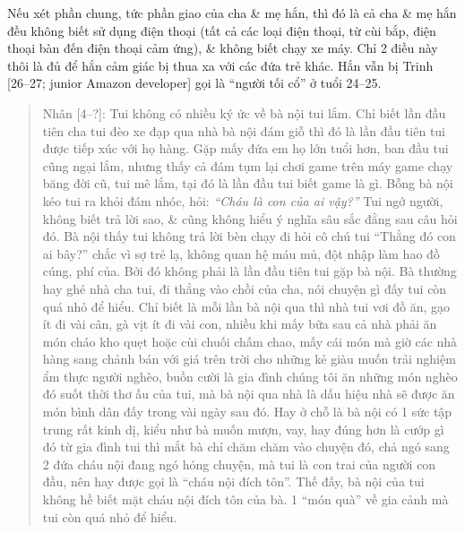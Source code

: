 \documentclass[12pt,oneside]{book}
\begin{document}
Nếu xét phần chung, tức phần giao của cha \& mẹ hắn, thì đó là cả cha \& mẹ hắn đều không biết sử dụng điện thoại (tất cả các loại điện thoại, từ cùi bắp, điện thoại bàn đến điện thoại cảm ứng), \& không biết chạy xe máy. Chỉ 2 điều này thôi là đủ để hắn cảm giác bị thua xa với các đứa trẻ khác. Hắn vẫn bị {\sf Trinh [26--27; junior Amazon developer]} gọi là ``người tối cổ'' ở tuổi 24--25.
\begin{quote}
	{\sf Nhân [4--?]}: Tui không có nhiều ký ức về bà nội tui lắm. Chỉ biết lần đầu tiên cha tui đèo xe đạp qua nhà bà nội đám giỗ thì đó là lần đầu tiên tui được tiếp xúc với họ hàng. Gặp mấy đứa em họ lớn tuổi hơn, ban đầu tui cũng ngại lắm, nhưng thấy cả đám tụm lại chơi game trên máy game chạy băng đời cũ, tui mê lắm, tại đó là lần đầu tui biết game là gì. Bỗng bà nội kéo tui ra khỏi đám nhóc, hỏi: {\it``Cháu là con của ai vậy?''} Tui ngớ người, không biết trả lời sao, \& cũng không hiểu ý nghĩa sâu sắc đằng sau câu hỏi đó. Bà nội thấy tui không trả lời bèn chạy đi hỏi cô chú tui ``Thằng đó con ai bây?'' chắc vì sợ trẻ lạ, không quan hệ máu mủ, đột nhập làm hao đồ cúng, phí của. Bởi đó không phải là lần đầu tiên tui gặp bà nội. Bà thường hay ghé nhà cha tui, đi thẳng vào chồi của cha, nói chuyện gì đấy tui còn quá nhỏ để hiểu. Chỉ biết là mỗi lần bà nội qua thì nhà tui vơi đồ ăn, gạo ít đi vài cân, gà vịt ít đi vài con, nhiều khi mấy bữa sau cả nhà phải ăn món cháo kho quẹt hoặc cùi chuối chấm chao, mấy cái món mà giờ các nhà hàng sang chảnh bán với giá trên trời cho những kẻ giàu muốn trải nghiệm ẩm thực người nghèo, buồn cười là gia đình chúng tôi ăn những món nghèo đó suốt thời thơ ấu của tui, mà bà nội qua nhà là dấu hiệu nhà sẽ được ăn món bình dân đấy trong vài ngày sau đó. Hay ở chỗ là bà nội có 1 sức tập trung rất kinh dị, kiểu như bà muốn mượn, vay, hay đúng hơn là cướp gì đó từ gia đình tui thì mắt bà chỉ chăm chăm vào chuyện đó, chả ngó sang 2 đứa cháu nội đang ngó hóng chuyện, mà tui là con trai của người con đầu, nên hay được gọi là ``cháu nội đích tôn''. Thế đấy, bà nội của tui không hề biết mặt cháu nội đích tôn của bà. 1 ``món quà'' về gia cảnh mà tui còn quá nhỏ để hiểu.
	

\end{quote}
\end{document}
